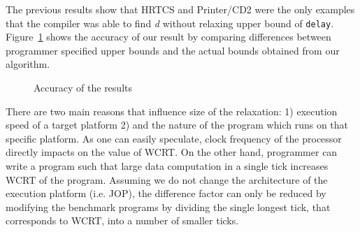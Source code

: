 The previous results show that HRTCS and Printer/CD2 were the only
examples that the compiler was able to find \textit{d} without relaxing
upper bound of \texttt{delay}. Figure~\ref{fig:graph} shows the accuracy
of our result by comparing differences between programmer specified
upper bounds and the actual bounds obtained from our algorithm.

\begin{figure}[h!]
	\centering
{}
\caption{Accuracy of the results}
\label{fig:graph}
\end{figure}

There are two main reasons that influence size of the relaxation: 1)
execution speed of a target platform 2) and the nature of the program
which runs on that specific platform. As one can easily speculate, clock
frequency of the processor directly impacts on the value of WCRT. On the
other hand, programmer can write a program such that large data
computation in a single tick increases WCRT of the program. Assuming we
do not change the architecture of the execution platform (i.e. JOP), the
difference factor can only be reduced by modifying the benchmark
programs by dividing the single longest tick, that corresponds to WCRT,
into a number of smaller ticks.

